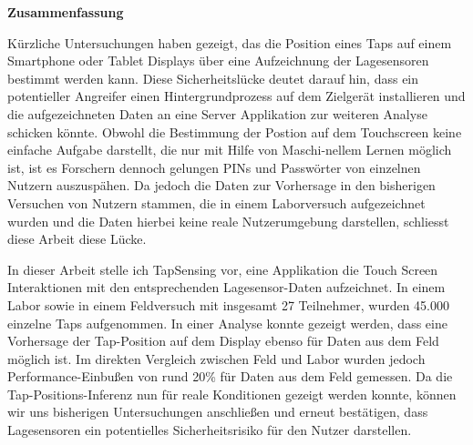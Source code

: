 \thispagestyle{empty}
\vspace*{1.2cm}

\begin{center}
    \textbf{Zusammenfassung}
\end{center}

\vspace*{0.5cm}

\noindent

Kürzliche Untersuchungen haben gezeigt, das die Position eines Taps auf einem Smartphone oder Tablet Displays \"uber eine Aufzeichnung der Lagesensoren bestimmt werden kann. Diese Sicherheitsl\"ucke deutet darauf hin, dass ein potentieller Angreifer einen Hintergrundprozess auf dem Zielger\"at installieren und die aufgezeichneten Daten an eine Server Applikation zur weiteren Analyse schicken k\"onnte. Obwohl die Bestimmung der Postion auf dem Touchscreen keine einfache Aufgabe darstellt, die nur mit Hilfe von Maschi-nellem Lernen m\"oglich ist, ist es Forschern dennoch gelungen PINs und Passw\"orter von einzelnen Nutzern auszusp\"ahen. Da jedoch die Daten zur Vorhersage in den bisherigen Versuchen von Nutzern stammen, die in einem Laborversuch aufgezeichnet wurden und die Daten hierbei keine reale Nutzerumgebung darstellen, schliesst diese Arbeit diese L\"ucke.

In dieser Arbeit stelle ich TapSensing vor, eine Applikation die Touch Screen Interaktionen mit den entsprechenden Lagesensor-Daten aufzeichnet. In einem Labor sowie in einem Feldversuch mit insgesamt 27 Teilnehmer, wurden 45.000 einzelne Taps aufgenommen. In einer Analyse konnte gezeigt werden, dass eine Vorhersage der Tap-Position auf dem Display ebenso f\"ur Daten aus dem Feld m\"oglich ist. Im direkten Vergleich zwischen Feld und Labor wurden jedoch Performance-Einbußen von rund 20\% f\"ur Daten aus dem Feld gemessen. Da die Tap-Positions-Inferenz nun f\"ur reale Konditionen gezeigt werden konnte, k\"onnen wir uns bisherigen Untersuchungen anschließen und erneut bestätigen, dass Lagesensoren ein potentielles Sicherheitsrisiko f\"ur den Nutzer darstellen.

